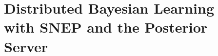 \vspace{10cm}
\chapter{Distributed Bayesian Learning with SNEP and the Posterior Server}
\label{chp:posterior-server}



